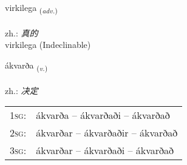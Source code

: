 \documentclass[frontgrid, backgrid]{flacards}\usepackage[]{graphicx}\usepackage[]{xcolor}
\begin{document}

\renewcommand{\flhead}{\vskip5pt \fboxsep=0pt {\small\bfseries\footnotesize Atviksorð | 副词}}
\renewcommand{\fcfoot}{\vskip5pt \fboxsep=0pt \hspace{2pt}{\small\bfseries\footnotesize 3K}}

\renewcommand{\blhead}{\vskip5pt {\small\bfseries\footnotesize Atviksorð | 副词 }}
\renewcommand{\bcfoot}{\vskip5pt \hspace{2pt}{\small\bfseries\footnotesize 3K}}


{virkilega \small{\textsubscript{(\textit{adv.})}} \\[1ex]
 \\
zh.: \emph{真的} \\  [2ex]
virkilega (Indeclinable)}

\renewcommand{\flhead}{\vskip5pt \fboxsep=0pt {\small\bfseries\footnotesize Sagnorð | 动词}}
\renewcommand{\fcfoot}{\vskip5pt \fboxsep=0pt \hspace{2pt}{\small\bfseries\footnotesize 3K}}

\renewcommand{\blhead}{\vskip5pt {\small\bfseries\footnotesize Sagnorð | 动词 }}
\renewcommand{\bcfoot}{\vskip5pt \hspace{2pt}{\small\bfseries\footnotesize 3K}}


{ákvarða \small{\textsubscript{(\textit{v.})}} \\[1ex] %
\textphonetic{[auːkʰvarða]} \\
zh.: \emph{决定} \\  [2ex]
\renewcommand*{\arraystretch}{0.8}
\begin{tabular}{p{1cm}l}
\textsc{1sg}: & ákvarða -- ákvarðaði -- ákvarðað \\ 
\textsc{2sg}: & ákvarðar -- ákvarðaðir -- ákvarðað \\ 
\textsc{3sg}: & ákvarðar -- ákvarðaði -- ákvarðað \\ 
\end{tabular}
}
\end{document}
